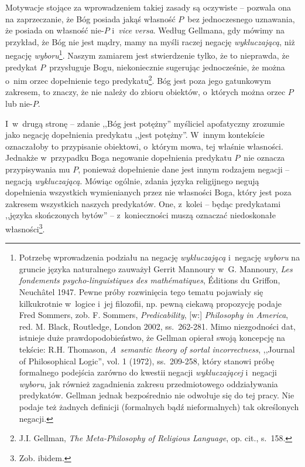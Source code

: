 Motywacje stojące za wprowadzeniem takiej zasady są oczywiste -- pozwala ona na zaprzeczanie, że Bóg posiada jakąś własność $P$~bez jednoczesnego uznawania, że posiada on własność nie-$P$ i~\textit{vice versa}. Według Gellmana, gdy mówimy na przykład, że Bóg nie jest mądry, mamy na myśli raczej negację \textit{wykluczającą}, niż negację \textit{wyboru}\footnote{Potrzebę wprowadzenia podziału na negację \textit{wykluczającą} i~negację \textit{wyboru} na gruncie języka naturalnego zauważył Gerrit Mannoury w~G. Mannoury, \textit{Les fondements psycho-linguistiques des mathématiques}, Éditions du Griffon, Neuchâtel 1947. Pewne próby rozwinięcia tego tematu pojawiały się kilkukrotnie w~logice i~jej filozofii, np. pewną ciekawą propozycję podaje Fred Sommers, zob. F. Sommers, \textit{Predicability}, [w:] \textit{Philosophy in America}, red. M. Black, Routledge, London 2002, ss.~262-281. Mimo niezgodności dat, istnieje duże prawdopodobieństwo, że Gellman opierał swoją koncepcję na tekście: R.H. Thomason, \textit{A~semantic theory of sortal incorrectness}, ,,Journal of Philosophical Logic'', vol. 1 (1972), ss.~209-258, który stanowi próbę formalnego podejścia zarówno do kwestii negacji \textit{wykluczającej} i~negacji \textit{wyboru}, jak również zagadnienia zakresu przedmiotowego oddziaływania predykatów. Gellman jednak bezpośrednio nie odwołuje się do tej pracy. Nie podaje też żadnych definicji (formalnych bądź nieformalnych) tak określonych negacji.}. Naszym zamiarem jest stwierdzenie tylko, że to nieprawda, że predykat $P$~przysługuje Bogu, niekoniecznie sugerując jednocześnie, że można o~nim orzec dopełnienie tego predykatu\footnote{J.I. Gellman, \textit{The Meta-Philosophy of Religious Language}, op. cit., s.~158.}. Bóg jest poza jego gatunkowym zakresem, to znaczy, że nie należy do zbioru obiektów, o~których można orzec $P$ lub nie-$P$.

I~w~drugą stronę -- zdanie ,,Bóg jest potężny'' myśliciel apofatyczny zrozumie jako negację dopełnienia predykatu ,,jest potężny''. W~innym kontekście oznaczałoby to przypisanie obiektowi, o~którym mowa, tej właśnie własności. Jednakże w~przypadku Boga negowanie dopełnienia predykatu $P$~nie oznacza przypisywania mu $P$, ponieważ dopełnienie dane jest innym rodzajem negacji -- negacją \textit{wykluczającą}. Mówiąc ogólnie, zdania języka religijnego negują dopełnienia wszystkich wymienianych przez nie własności Boga, który jest poza zakresem wszystkich naszych predykatów. One, z~kolei -- będąc predykatami ,,języka skończonych bytów'' -- z~konieczności muszą oznaczać niedoskonałe własności\footnote{Zob. ibidem.}.

